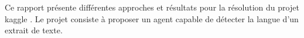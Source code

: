 \noindent Ce rapport présente différentes approches et résultats pour la résolution du projet kaggle \cite{NLP-CS-25}. Le projet consiste à proposer un agent capable de détecter la langue d'un extrait de texte.